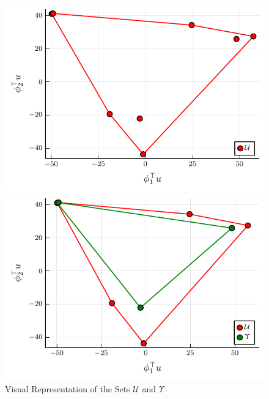 \documentclass{beamer}
\begin{document}
\begin{frame}
\begin{figure}
  \begin{center}
  \begin{minipage}{0.45\linewidth}
    \centering
	\includegraphics[width=\textwidth]{../../pres_roil/plots/visual_U.pdf}

  \end{minipage}
  \hspace{0.05\linewidth}
  \begin{minipage}{0.45\linewidth}
    \centering
	\includegraphics[width=\textwidth]{../../pres_roil/plots/visual_U_and_Upsilon.pdf}

  \end{minipage}
  \end{center}
\caption{Visual Representation of the Sets $\mathcal{U}$ and $\Upsilon$}
\end{figure}

\end{frame}
\end{document}
